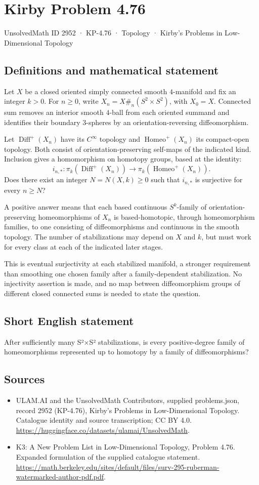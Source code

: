 \documentclass[11pt,a4paper]{article}
\begin{document}
\section*{Kirby Problem 4.76}\label{2952}
{\small UnsolvedMath ID 2952 · KP-4.76 · Topology · Kirby's Problems in Low-Dimensional Topology}
\subsection{Definitions and mathematical statement}
Let $X$ be a closed oriented simply connected smooth $4$-manifold
and fix an integer $k>0$. For $n\ge0$, write
$X_n=X\#_{n}(S^2\times S^2)$, with $X_0=X$.
Connected sum removes an interior smooth $4$-ball from each
oriented summand and identifies their boundary $3$-spheres by an
orientation-reversing diffeomorphism.

Let $\operatorname{Diff}^+(X_n)$ have its $C^\infty$ topology
and $\operatorname{Homeo}^+(X_n)$ its compact-open topology.
Both consist of orientation-preserving self-maps of the indicated
kind. Inclusion gives a homomorphism on homotopy groups, based
at the identity:
\[
 i_{n,*}:\pi_k(\operatorname{Diff}^+(X_n))
       \longrightarrow\pi_k(\operatorname{Homeo}^+(X_n)).
\]
Does there exist an integer $N=N(X,k)\ge0$ such that $i_{n,*}$
is surjective for every $n\ge N$?

A positive answer means that each based continuous $S^k$-family
of orientation-preserving homeomorphisms of $X_n$ is based-homotopic,
through homeomorphism families, to one consisting of diffeomorphisms
and continuous in the smooth topology. The number of stabilizations
may depend on $X$ and $k$, but must work for every class at each
of the indicated later stages.

This is eventual surjectivity at each stabilized manifold, a
stronger requirement than smoothing one chosen family after a
family-dependent stabilization. No injectivity assertion is made,
and no map between diffeomorphism groups of different closed
connected sums is needed to state the question.
\subsection{Short English statement}
After sufficiently many S²×S² stabilizations, is every positive-degree family of homeomorphisms represented up to homotopy by a family of diffeomorphisms?
\subsection{Sources}
\begin{itemize}
\item[S1] ULAM.AI and the UnsolvedMath Contributors, supplied problems.json, record 2952 (KP-4.76), Kirby's Problems in Low-Dimensional Topology. Catalogue identity and source transcription; CC BY 4.0.
\url{https://huggingface.co/datasets/ulamai/UnsolvedMath}.
\item[S2] K3: A New Problem List in Low-Dimensional Topology, Problem 4.76. Expanded formulation of the supplied catalogue statement.
\url{https://math.berkeley.edu/sites/default/files/surv-295-ruberman-watermarked-author-pdf.pdf}.
\end{itemize}
\end{document}
